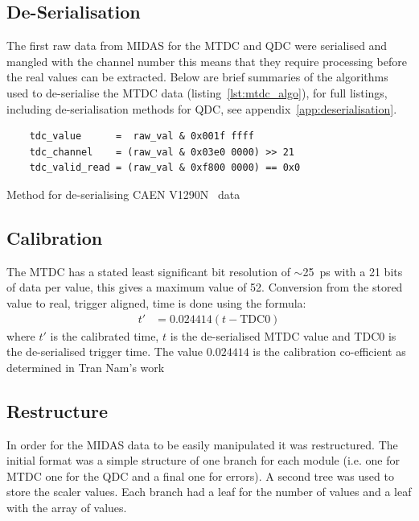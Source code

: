 \subsection{De-Serialisation} %
\label{sub:de_serialisation}
The first raw data from MIDAS for the MTDC and QDC were serialised and mangled with the channel number this means that they require processing before the real values can be extracted. Below are brief summaries of the algorithms used to de-serialise the MTDC data (listing~\ref{lst:mtdc_algo}), for full listings, including de-serialisation methods for QDC, see appendix~\ref{app:deserialisation}.
%
\begin{listing}[htbp]
    \begin{verbatim}
    tdc_value      =  raw_val & 0x001f ffff
    tdc_channel    = (raw_val & 0x03e0 0000) >> 21
    tdc_valid_read = (raw_val & 0xf800 0000) == 0x0
    \end{verbatim}
    \caption{Method for de-serialising CAEN V1290N~\cite{CAENV1290N} data}
    \label{lst:mtdc_algo}
\end{listing}
\subsection{Calibration} %
\label{sub:calibration}
The MTDC has a stated least significant bit resolution of $\sim$25~ps with a 21 bits of data per value, this gives a maximum value of 52\mus{}. Conversion from the stored value to real, trigger aligned, time is done using the formula:
\begin{align}\label{equ:tdc_calibration}
    t'   &= 0.024414(t - \text{TDC}0)
\end{align}
where $t'$ is the calibrated time, $t$ is the de-serialised MTDC value and TDC$0$ is the de-serialised trigger time. The value $0.024414$ is the calibration co-efficient as determined in Tran Nam's work~\cite{timecalibNam2012}
\subsection{Restructure} %
\label{sub:restructure}
In order for the MIDAS data to be easily manipulated it was restructured. The initial format was a simple structure of one branch for each module (i.e. one for MTDC one for the QDC and a final one for errors). A second tree was used to store the scaler values. Each branch had a leaf for the number of values and a leaf with the array of values.

